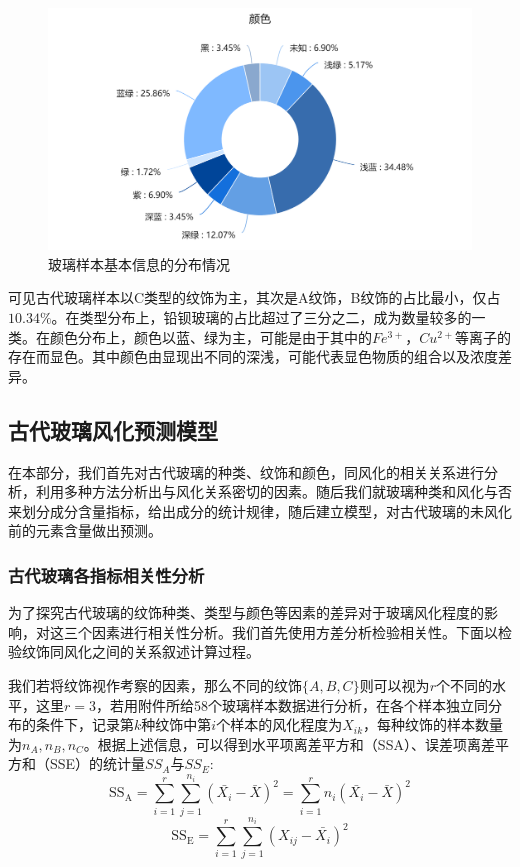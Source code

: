 \documentclass{my_paper}
\begin{document}
\begin{figure}[htbp]
{    \begin{minipage}{0.5\textwidth}
    \centering    %
    \includegraphics[width=\textwidth]{513ys.png}%
    \end{minipage}
    }
    \caption{玻璃样本基本信息的分布情况}    %
    \label{513}    %
\end{figure}
可见古代玻璃样本以C类型的纹饰为主，其次是A纹饰，B纹饰的占比最小，仅占$10.34\%$。在类型分布上，铅钡玻璃的占比超过了三分之二，成为数量较多的一类。在颜色分布上，颜色以蓝、绿为主，可能是由于其中的$Fe^{3+}$，$ Cu^{2+} $等离子的存在而显色\cite{3}。其中颜色由显现出不同的深浅，可能代表显色物质的组合以及浓度差异。
\subsection{古代玻璃风化预测模型}
在本部分，我们首先对古代玻璃的种类、纹饰和颜色，同风化的相关关系进行分析，利用多种方法分析出与风化关系密切的因素。随后我们就玻璃种类和风化与否来划分成分含量指标，给出成分的统计规律，随后建立模型，对古代玻璃的未风化前的元素含量做出预测。

\subsubsection{古代玻璃各指标相关性分析}
为了探究古代玻璃的纹饰种类、类型与颜色等因素的差异对于玻璃风化程度的影响，对这三个因素进行相关性分析。我们首先使用方差分析\cite{2}检验相关性。下面以检验纹饰同风化之间的关系叙述计算过程。

我们若将纹饰视作考察的因素，那么不同的纹饰$\{A,B,C\}$则可以视为$r$个不同的水平，这里$r=3$，若用附件所给58个玻璃样本数据进行分析，在各个样本独立同分布的条件下，记录第$k$种纹饰中第$i$个样本的风化程度为$X_{ik}$，每种纹饰的样本数量为$n_A,n_B,n_C$。根据上述信息，可以得到水平项离差平方和（SSA）、误差项离差平方和（SSE）的统计量$SS_A$与$SS_E$:
\begin{equation}
    \mathrm{SS}_{\mathrm{A}}=\sum_{i=1}^{r} \sum_{j=1}^{n_{i}}\left(\bar{X_{i}}-\bar{X}\right)^{2}=\sum_{i=1}^{r} n_{i}\left(\bar{X_{i}}-\bar{X}\right)^{2} 
\label{ssa}
\end{equation}
\begin{equation}
    \mathrm{SS}_{\mathrm{E}}=\sum_{i=1}^{r} \sum_{j=1}^{n_{i}}\left(X_{i j}-\bar{X_{i}}\right)^{2}
    \label{sse}
\end{equation}
\end{document}

